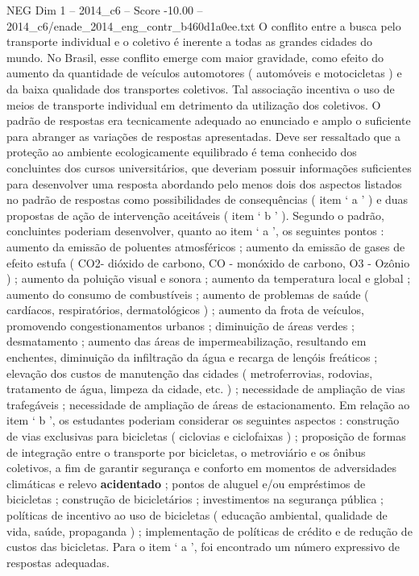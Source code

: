 \begin{textsample}{NEG Dim 1 – 2014\_c6 – Score -10.00 – 2014\_c6/enade\_2014\_eng\_contr\_b460d1a0ee.txt}
O conflito entre a busca pelo transporte individual e o coletivo é inerente a todas as grandes cidades do mundo.
No Brasil, esse conflito emerge com maior gravidade, como efeito do aumento da quantidade de veículos automotores ( automóveis e motocicletas ) e da baixa qualidade dos transportes coletivos.
Tal associação incentiva o uso de meios de transporte individual em detrimento da utilização dos coletivos.
O padrão de respostas era tecnicamente adequado ao enunciado e amplo o suficiente para abranger as variações de respostas apresentadas.
Deve ser ressaltado que a proteção ao ambiente ecologicamente equilibrado é tema conhecido dos concluintes dos cursos universitários, que deveriam possuir informações suficientes para desenvolver uma resposta abordando pelo menos dois dos aspectos listados no padrão de respostas como possibilidades de consequências ( item ‘ a ’ ) e duas propostas de ação de intervenção aceitáveis ( item ‘ b ’ ).
Segundo o padrão, concluintes poderiam desenvolver, quanto ao item ‘ a ’, os seguintes pontos : aumento da emissão de poluentes atmosféricos ; aumento da emissão de gases de efeito estufa ( CO2- dióxido de carbono, CO - monóxido de carbono, O3 - Ozônio ) ; aumento da poluição visual e sonora ; aumento da temperatura local e global ; aumento do consumo de combustíveis ; aumento de problemas de saúde ( cardíacos, respiratórios, dermatológicos ) ; aumento da frota de veículos, promovendo congestionamentos urbanos ; diminuição de áreas verdes ; desmatamento ; aumento das áreas de impermeabilização, resultando em enchentes, diminuição da infiltração da água e recarga de lençóis freáticos ; elevação dos custos de manutenção das cidades ( metroferrovias, rodovias, tratamento de água, limpeza da cidade, etc. ) ; necessidade de ampliação de vias trafegáveis ; necessidade de ampliação de áreas de estacionamento.
Em relação ao item ‘ b ’, os estudantes poderiam considerar os seguintes aspectos : construção de vias exclusivas para bicicletas ( ciclovias e ciclofaixas ) ; proposição de formas de integração entre o transporte por bicicletas, o metroviário e os ônibus coletivos, a fim de garantir segurança e conforto em momentos de adversidades climáticas e relevo \textbf{acidentado} ; pontos de aluguel e/ou empréstimos de bicicletas ; construção de bicicletários ; investimentos na segurança pública ; políticas de incentivo ao uso de bicicletas ( educação ambiental, qualidade de vida, saúde, propaganda ) ; implementação de políticas de crédito e de redução de custos das bicicletas.
Para o item ‘ a ’, foi encontrado um número expressivo de respostas adequadas.

\end{textsample}
